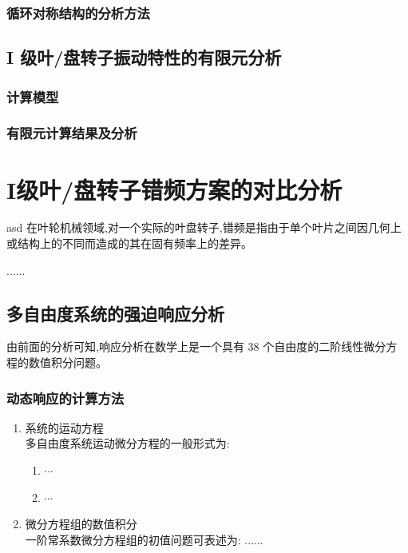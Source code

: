 \documentclass[doctor, openright, oneside]{gdutthesis}
\begin{document}
\subsection{循环对称结构的分析方法}
\section{I 级叶/盘转子振动特性的有限元分析}
\subsection{计算模型}

\subsection{有限元计算结果及分析}

\chapter{I级叶/盘转子错频方案的对比分析}
asd
在叶轮机械领域,对一个实际的叶盘转子,错频是指由于单个叶片之间因几何上
或结构上的不同而造成的其在固有频率上的差异。\par

......\par

\section{多自由度系统的强迫响应分析}

由前面的分析可知,响应分析在数学上是一个具有 38 个自由度的二阶线性微分方
程的数值积分问题\cite{article}。\par

\subsection{动态响应的计算方法}

\begin{enumerate}
\item 系统的运动方程\\
多自由度系统运动微分方程的一般形式为:
\begin{enumerate}
\item $\cdots$
\item $\cdots$
\end{enumerate}
\item 微分方程组的数值积分\\
一阶常系数微分方程组的初值问题可表述为: ......
\end{enumerate}
\end{document}
